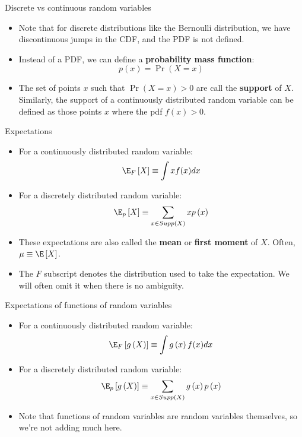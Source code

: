\documentclass[aspectratio=169,11pt]{beamer}
\begin{document}
\begin{frame}{Discrete vs continuous random variables}
\begin{itemize}
	\item Note that for discrete distributions like the Bernoulli distribution, we
		have discontinuous jumps in the CDF, and the PDF is not defined.
		
	\medskip
	\item Instead of a PDF, we can define a {\bf probability mass function}:
	\[
		p\left(x\right) = \Pr\left(X=x\right)
	\]
	
	\medskip
	\item The set of points $x$ such that $\Pr\left(X=x\right)>0$ are call the {\bf support}
			of $X$. Similarly, the support of a continuously distributed random variable
			can be defined as those points $x$ where the pdf $f(x)>0$.
	
	
		
\end{itemize}
\end{frame}





\begin{frame}{Expectations}
\begin{itemize}
	\item For a continuously distributed random variable:\[
		\E_F \left[ X \right] \equiv \int xf(x)dx
	\]
	
	\medskip
	\item For a discretely distributed random variable:\[
		\E_p \left[ X \right] \equiv \sum_{x\in Supp\left(X\right)} x p\left(x\right)
	\]
	
	\medskip
	\item These expectations are also called the {\bf mean} or {\bf first moment} of $X$. Often, $\mu\equiv \E\left[X\right]$.
		
	\medskip
	\item The $F$ subscript denotes the distribution used to take the expectation. We will often omit it when there is no ambiguity.
\end{itemize}
\end{frame}


\begin{frame}{Expectations of functions of random variables}
\begin{itemize}
	\item For a continuously distributed random variable:\[
		\E_F \left[ g\left(X\right) \right] \equiv \int g\left(x\right)f(x)dx
	\]
	
	\medskip
	\item For a discretely distributed random variable:\[
		\E_p \left[ g\left(X\right) \right] \equiv \sum_{x\in Supp\left(X\right)} g\left(x\right) p\left(x\right)
	\]
	
	\medskip
	\item Note that functions of random variables are random variables themselves, so we're not adding much here.

\end{itemize}
\end{frame}
\end{document}
